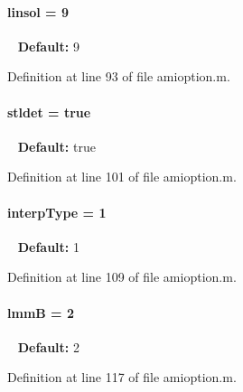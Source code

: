 \paragraph[{linsol}]{\setlength{\rightskip}{0pt plus 5cm}linsol = 9}\label{classamioption_a06749b49eaa313f4d00f0115d3a7a7f3}
~\newline
{\bfseries Default\+:} 9 

Definition at line 93 of file amioption.\+m.

\hypertarget{classamioption_a202e02f7d8c1a87b1c675bcc1acf1c8e}{}
\paragraph[{stldet}]{\setlength{\rightskip}{0pt plus 5cm}stldet = true}\label{classamioption_a202e02f7d8c1a87b1c675bcc1acf1c8e}
~\newline
{\bfseries Default\+:} true 

Definition at line 101 of file amioption.\+m.

\hypertarget{classamioption_ad06cc805fa18b06ac937fd98a9eba0e7}{}
\paragraph[{interp\+Type}]{\setlength{\rightskip}{0pt plus 5cm}interp\+Type = 1}\label{classamioption_ad06cc805fa18b06ac937fd98a9eba0e7}
~\newline
{\bfseries Default\+:} 1 

Definition at line 109 of file amioption.\+m.

\hypertarget{classamioption_afbc60e75d11740bf27f5a7fc5706fd44}{}
\paragraph[{lmm\+B}]{\setlength{\rightskip}{0pt plus 5cm}lmm\+B = 2}\label{classamioption_afbc60e75d11740bf27f5a7fc5706fd44}
~\newline
{\bfseries Default\+:} 2 

Definition at line 117 of file amioption.\+m.

\hypertarget{classamioption_ae6a49cec21ffe790217be29b0fced832}{}
